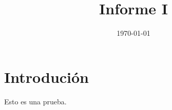 \documentclass[]{article}
\title{Informe I}
\author{}
\date{\today}
\begin{document}
\tableofcontents

\section{Introdución}
Esto es una prueba.
\end{document}
